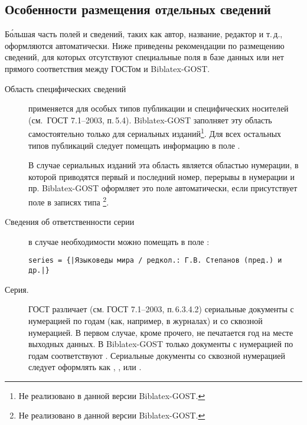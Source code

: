 \documentclass[10pt,a4paper,headings=small,numbers=enddot,english,russian]{ltxdockit}[2011/03/25]
\newcommand*{\biblatex}{Biblatex\xspace}
\newcommand*{\biblatexgost}{\biblatex-GOST\xspace}
\newcommand*{\gostbibname}[1][]{ГОСТ#1 7.1--2003}
\newcommand*{\gostbibref}[2][]{\gostbibname[#1], п.\,#2}
\newcommand*{\notimpl}{\footnote{Не реализовано в данной версии \biblatexgost.}}
\begin{document}
\subsection{Особенности размещения отдельных сведений}
\label{sec:db:inf}

Б\'{о}льшая часть полей и сведений, таких как автор, название, редактор и т.\,д., оформляются
автоматически. 
Ниже приведены рекомендации по размещению сведений, для которых отсутствуют
специальные поля в базе данных или нет прямого соответствия между ГОСТом и \biblatexgost.

\begin{description}
%
%
\item[Область специфических сведений] применяется для
особых типов публикации и специфических носителей (см.~\gostbibref{5.4}). 
\biblatexgost заполняет эту область самостоятельно только для
сериальных изданий\notimpl. 
Для всех остальных типов публикаций
следует помещать информацию в поле . 


В случае сериальных изданий эта область является областью нумерации, в которой приводятся 
первый и последний номер, перерывы в нумерации и пр. \biblatexgost оформляет это поле 
автоматически, если присутствует поле  в записях типа \notimpl.

\item[Cведения об ответственности серии] в случае необходимости можно помещать 
в поле :  
\begin{lstlisting}[style=bibtex,escapechar=|]
series = {|Языковеды мира / редкол.: Г.В. Степанов (пред.) и др.|}
\end{lstlisting}

\item[Серия.] \label{series}ГОСТ различает (см. \gostbibref{6.3.4.2}) сериальные документы 
с нумерацией по годам 
(как, например, в журналах) и со сквозной нумерацией. В первом случае, кроме прочего, 
не печатается год на месте выходных данных. В \biblatexgost только документы
с нумерацией по годам соответствуют .  Сериальные документы со 
сквозной нумерацией следует оформлять как , ,
 или . 


\end{description}
\end{document}
